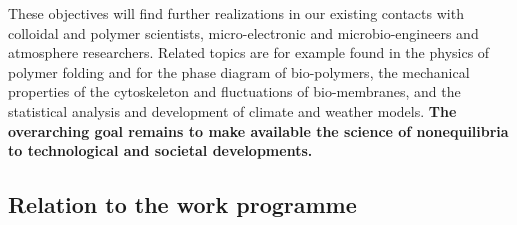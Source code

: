 These objectives will find further realizations in our existing contacts with colloidal and
polymer scientists, micro-electronic and microbio-engineers and atmosphere researchers. Related topics are for
example found in the physics of polymer folding and for the phase diagram of bio-polymers, the
mechanical properties of the cytoskeleton and fluctuations of bio-membranes, and the
statistical analysis and development of climate and weather models. {\bf The overarching goal
remains to make available the science of nonequilibria to technological and societal
developments.}



\subsection{Relation to the work programme}\label{sec:relation-wp}

